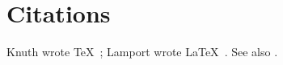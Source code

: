 \documentclass{article}
\begin{document}
\section{Citations}
Knuth wrote \TeX\ \cite{knuth}; Lamport wrote \LaTeX\
\cite{lamport}. See also
\cite{knuth,lamport}.


\end{document}
